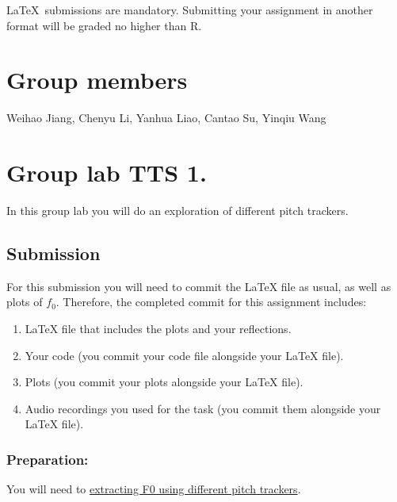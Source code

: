 \documentclass{../labbook}
\begin{document}
\begin{mdframed}[backgroundcolor=blue!20]
\LaTeX ~submissions are mandatory. Submitting your assignment in another format will be graded no higher than R.
\end{mdframed}

\section{Group members}
Weihao Jiang, Chenyu Li, Yanhua Liao, Cantao Su, Yinqiu Wang

\section{Group lab TTS 1.}
In this group lab you will do an exploration of different pitch trackers.

\subsection{Submission}
For this submission you will need to commit the LaTeX file as usual, as well as plots of $f_0$. Therefore, the completed commit for this assignment includes:
\begin{enumerate}
    \item LaTeX file that includes the plots and your reflections.
    \item Your code (you commit your code file alongside your LaTeX file).
    \item Plots (you commit your plots alongside your LaTeX file).
    \item Audio recordings you used for the task (you commit them alongside your LaTeX file).
\end{enumerate}

\subsubsection*{Preparation:}

You will need to \underline{extracting F0 using different pitch trackers}. 
\end{document}
